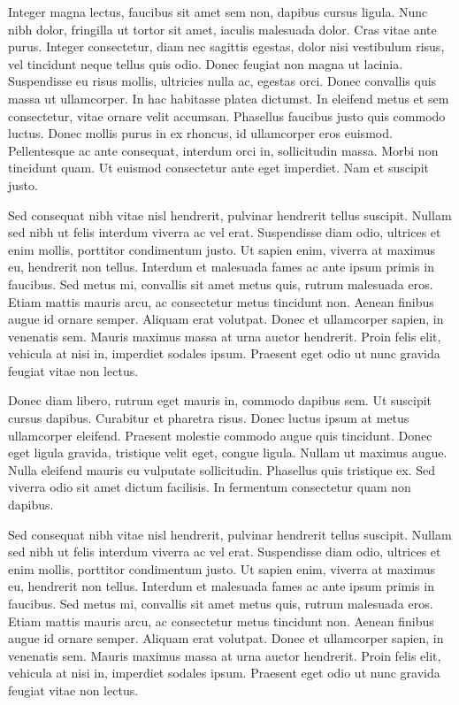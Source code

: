 \documentclass[12pt, a4paper]{article}
\begin{document}
Integer magna lectus, faucibus sit amet sem non, dapibus cursus ligula. Nunc nibh dolor, fringilla ut tortor sit amet, iaculis malesuada dolor. Cras vitae ante purus. Integer consectetur, diam nec sagittis egestas, dolor nisi vestibulum risus, vel tincidunt neque tellus quis odio. Donec feugiat non magna ut lacinia. Suspendisse eu risus mollis, ultricies nulla ac, egestas orci. Donec convallis quis massa ut ullamcorper. In hac habitasse platea dictumst. In eleifend metus et sem consectetur, vitae ornare velit accumsan. Phasellus faucibus justo quis commodo luctus. Donec mollis purus in ex rhoncus, id ullamcorper eros euismod. Pellentesque ac ante consequat, interdum orci in, sollicitudin massa. Morbi non tincidunt quam. Ut euismod consectetur ante eget imperdiet. Nam et suscipit justo.

Sed consequat nibh vitae nisl hendrerit, pulvinar hendrerit tellus suscipit. Nullam sed nibh ut felis interdum viverra ac vel erat. Suspendisse diam odio, ultrices et enim mollis, porttitor condimentum justo. Ut sapien enim, viverra at maximus eu, hendrerit non tellus. Interdum et malesuada fames ac ante ipsum primis in faucibus. Sed metus mi, convallis sit amet metus quis, rutrum malesuada eros. Etiam mattis mauris arcu, ac consectetur metus tincidunt non. Aenean finibus augue id ornare semper. Aliquam erat volutpat. Donec et ullamcorper sapien, in venenatis sem. Mauris maximus massa at urna auctor hendrerit. Proin felis elit, vehicula at nisi in, imperdiet sodales ipsum. Praesent eget odio ut nunc gravida feugiat vitae non lectus.

Donec diam libero, rutrum eget mauris in, commodo dapibus sem. Ut suscipit cursus dapibus. Curabitur et pharetra risus. Donec luctus ipsum at metus ullamcorper eleifend. Praesent molestie commodo augue quis tincidunt. Donec eget ligula gravida, tristique velit eget, congue ligula. Nullam ut maximus augue. Nulla eleifend mauris eu vulputate sollicitudin. Phasellus quis tristique ex. Sed viverra odio sit amet dictum facilisis. In fermentum consectetur quam non dapibus.


Sed consequat nibh vitae nisl hendrerit, pulvinar hendrerit tellus suscipit. Nullam sed nibh ut felis interdum viverra ac vel erat. Suspendisse diam odio, ultrices et enim mollis, porttitor condimentum justo. Ut sapien enim, viverra at maximus eu, hendrerit non tellus. Interdum et malesuada fames ac ante ipsum primis in faucibus. Sed metus mi, convallis sit amet metus quis, rutrum malesuada eros. Etiam mattis mauris arcu, ac consectetur metus tincidunt non. Aenean finibus augue id ornare semper. Aliquam erat volutpat. Donec et ullamcorper sapien, in venenatis sem. Mauris maximus massa at urna auctor hendrerit. Proin felis elit, vehicula at nisi in, imperdiet sodales ipsum. Praesent eget odio ut nunc gravida feugiat vitae non lectus.
\end{document}
